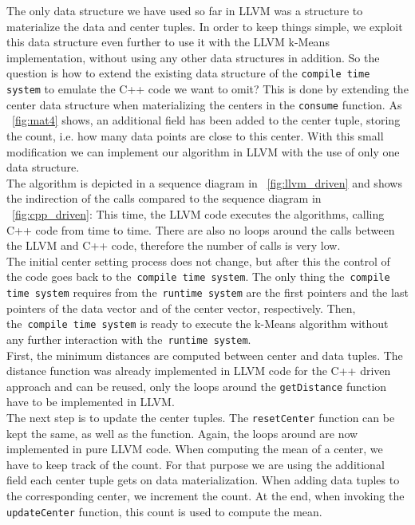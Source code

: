 The only data structure we have used so far in LLVM was a structure to materialize the data and center tuples. In order to keep things simple, we exploit this data structure even further to use it with the LLVM k-Means implementation, without using any other data structures in addition.
So the question is how to extend the existing data structure of the \texttt{compile time system} to emulate the C++ code we want to omit? This is done by extending the center data structure when materializing the centers in the \texttt{consume} function. As ~\autoref{fig:mat4} shows, an additional field has been added to the center tuple, storing the count, i.e. how many data points are close to this center. With this small modification we can implement our algorithm in LLVM with the use of only one data structure.
\\
The algorithm is depicted in a sequence diagram in ~\autoref{fig:llvm_driven} and shows the indirection of the calls compared to the sequence diagram in ~\autoref{fig:cpp_driven}: This time, the LLVM code executes the algorithms, calling C++ code from time to time. There are also no loops around the calls between the LLVM and C++ code, therefore the number of calls is very low. 
\\
The initial center setting process does not change, but after this the control of the code goes back to the~\texttt{compile time system}. The only thing the~\texttt{compile time system} requires from the~\texttt{runtime system} are the first pointers and the last pointers of the data vector and of the center vector, respectively. Then, the~\texttt{compile time system} is ready to execute the k-Means algorithm without any further interaction with the~\texttt{runtime system}. 
\\
First, the minimum distances are computed between center and data tuples. The distance function was already implemented in LLVM code for the C++ driven approach and can be reused, only the loops around the \texttt{getDistance} function have to be implemented in LLVM. 
\\
The next step is to update the center tuples. The \texttt{resetCenter} function can be kept the same, as well as the  function. Again, the loops around are now implemented in pure LLVM code. When computing the mean of a center, we have to keep track of the count. For that purpose we are using the additional field each center tuple gets on data materialization. When adding data tuples to the corresponding center, we increment the count. At the end, when invoking the \texttt{updateCenter} function, this count is used to compute the mean. 



